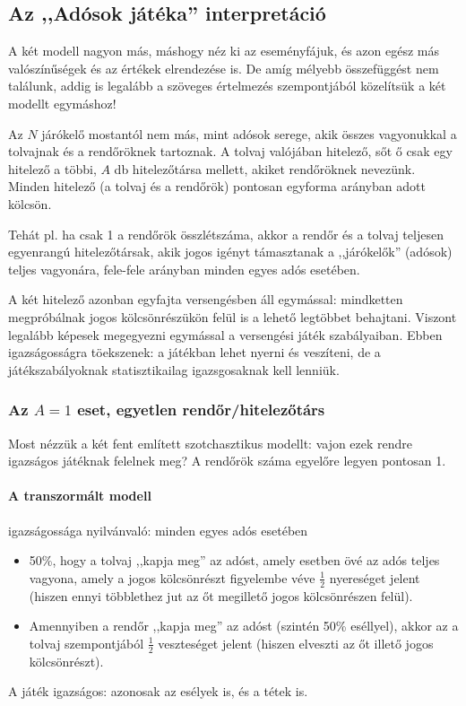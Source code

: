 \documentclass{article}
\begin{document}
	\subsection{Az ,,Adósok játéka'' interpretáció}
	
	A két modell nagyon más, máshogy néz ki az eseményfájuk, és azon egész más  valószínűségek és az értékek elrendezése is.
	De amíg mélyebb összefüggést nem találunk, addig is legalább a szöveges értelmezés szempontjából közelítsük a két modellt egymáshoz!

	Az $N$ járókelő mostantól nem más, mint adósok serege, akik összes vagyonukkal a tolvajnak és a rendőröknek tartoznak. A tolvaj valójában hitelező, sőt ő csak egy hitelező a többi, $A$ db hitelezőtársa mellett, akiket rendőröknek nevezünk. Minden hitelező (a tolvaj és a rendőrök) pontosan egyforma arányban adott kölcsön.

	Tehát pl. ha csak 1 a rendőrök összlétszáma, akkor a rendőr és a tolvaj teljesen egyenrangú hitelezőtársak, akik jogos igényt támasztanak a ,,járókelők'' (adósok) teljes vagyonára, fele-fele arányban minden egyes adós esetében.

	A két hitelező azonban egyfajta versengésben áll egymással: mindketten megpróbálnak jogos kölcsönrészükön felül is a lehető legtöbbet behajtani.
	Viszont legalább képesek megegyezni egymással a versengési játék szabályaiban. Ebben igazságosságra töekszenek: a játékban lehet nyerni és veszíteni, de a játékszabályoknak statisztikailag igazsgosaknak kell lenniük.

	\subsubsection{Az $A=1$ eset, egyetlen rendőr/hitelezőtárs}

	Most nézzük a két fent említett szotchasztikus modellt: vajon ezek rendre igazságos játéknak felelnek meg? A rendőrök száma egyelőre legyen pontosan 1.

	\paragraph{A transzormált modell} igazságossága nyilvánvaló:
	minden egyes adós esetében 
	\begin{itemize}
		\item 50\%, hogy a tolvaj ,,kapja meg'' az adóst, amely esetben övé az adós teljes vagyona, amely a jogos kölcsönrészt figyelembe véve $\frac12$ nyereséget jelent (hiszen ennyi többlethez jut az őt megillető jogos kölcsönrészen felül).
		\item Amennyiben a rendőr ,,kapja meg'' az adóst (szintén 50\% eséllyel), akkor az a tolvaj szempontjából $\frac12$ veszteséget jelent (hiszen elveszti az őt illető jogos kölcsönrészt).
	\end{itemize}
	A játék igazságos: azonosak az esélyek is, és a tétek is.
\end{document}
